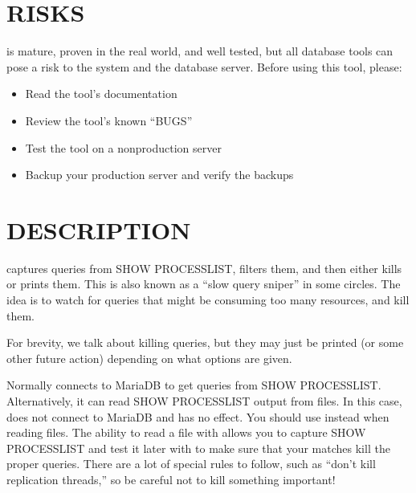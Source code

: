 \documentclass[letterpaper,10pt,english]{sphinxmanual}
\begin{document}
\section{RISKS}
\label{\detokenize{mariadb-kill:risks}}
\sphinxAtStartPar
{} is mature, proven in the real world, and well tested,
but all database tools can pose a risk to the system and the database
server.  Before using this tool, please:
\begin{itemize}
\item {} 
\sphinxAtStartPar
Read the tool’s documentation

\item {} 
\sphinxAtStartPar
Review the tool’s known “BUGS”

\item {} 
\sphinxAtStartPar
Test the tool on a non\sphinxhyphen{}production server

\item {} 
\sphinxAtStartPar
Backup your production server and verify the backups

\end{itemize}


\section{DESCRIPTION}
\label{\detokenize{mariadb-kill:description}}
\sphinxAtStartPar
{} captures queries from SHOW PROCESSLIST, filters them, and then either
kills or prints them.  This is also known as a “slow query sniper” in some
circles.  The idea is to watch for queries that might be consuming too many
resources, and kill them.

\sphinxAtStartPar
For brevity, we talk about killing queries, but they may just be printed
(or some other future action) depending on what options are given.

\sphinxAtStartPar
Normally  connects to MariaDB to get queries from SHOW PROCESSLIST.
Alternatively, it can read SHOW PROCESSLIST output from files.  In this case,
 does not connect to MariaDB and {\hyperref[\detokenize{mariadb-kill:cmdoption-mariadb-kill-kill}]{}} has no effect.  You should
use {\hyperref[\detokenize{mariadb-kill:cmdoption-mariadb-kill-print}]{}} instead when reading files.  The ability to read a file
with {\hyperref[\detokenize{mariadb-kill:cmdoption-mariadb-kill-test-matching}]{}} allows you to capture SHOW PROCESSLIST and test it
later with  to make sure that your matches kill the proper queries.
There are a lot of special rules to follow, such as “don’t kill replication
threads,” so be careful not to kill something important!
\end{document}
